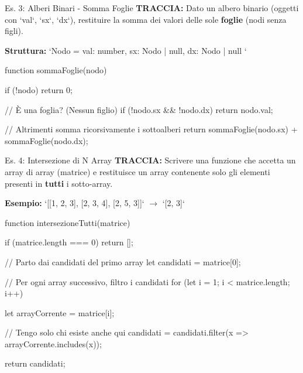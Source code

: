 \begin{esercizio}{Es. 3: Alberi Binari - Somma Foglie}
\textbf{TRACCIA:} Dato un albero binario (oggetti con `val`, `sx`, `dx`), restituire la somma dei valori delle sole \textbf{foglie} (nodi senza figli).

\textbf{Struttura:} `Nodo = { val: number, sx: Nodo | null, dx: Nodo | null }`
\end{esercizio}

\begin{jsbox}
function sommaFoglie(nodo) {
    if (!nodo) return 0;
    
    // È una foglia? (Nessun figlio)
    if (!nodo.sx && !nodo.dx) {
        return nodo.val;
    }
    
    // Altrimenti somma ricorsivamente i sottoalberi
    return sommaFoglie(nodo.sx) + sommaFoglie(nodo.dx);
}
\end{jsbox}

\begin{esercizio}{Es. 4: Intersezione di N Array}
\textbf{TRACCIA:} Scrivere una funzione che accetta un array di array (matrice) e restituisce un array contenente solo gli elementi presenti in \textbf{tutti} i sotto-array.

\textbf{Esempio:} `[[1, 2, 3], [2, 3, 4], [2, 5, 3]]` $\to$ `[2, 3]`
\end{esercizio}

\begin{jsbox}
function intersezioneTutti(matrice) {
    if (matrice.length === 0) return [];
    
    // Parto dai candidati del primo array
    let candidati = matrice[0];
    
    // Per ogni array successivo, filtro i candidati
    for (let i = 1; i < matrice.length; i++) {
        let arrayCorrente = matrice[i];
        
        // Tengo solo chi esiste anche qui
        candidati = candidati.filter(x => arrayCorrente.includes(x));
    }
    
    return candidati;
}
\end{jsbox}
